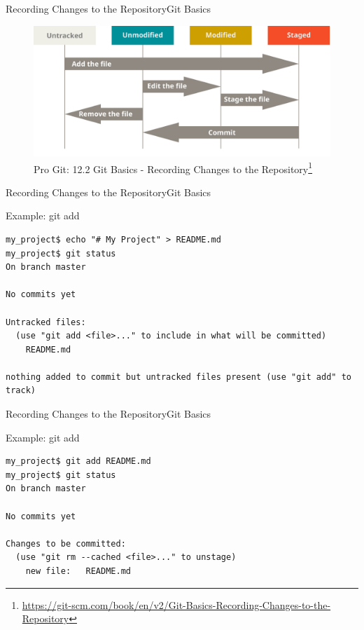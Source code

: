 \documentclass[aspectratio=169]{beamer}
\renewcommand{\footnotesize}{\tiny}
\begin{document}
\begin{frame}{Recording Changes to the Repository}{Git Basics}
\begin{figure}
    \centering
    \includegraphics[width=\textwidth,height=0.6\textheight,keepaspectratio]{lifecycle}
    \caption{
        Pro Git: 12.2 Git Basics - Recording Changes to the Repository\footnote{\url{https://git-scm.com/book/en/v2/Git-Basics-Recording-Changes-to-the-Repository}}
    }
\end{figure}
\end{frame}

\begin{frame}[fragile]{Recording Changes to the Repository}{Git Basics}
\begin{block}{Example: \ttfamily git add}
\begin{verbatim}
my_project$ echo "# My Project" > README.md
my_project$ git status 
On branch master

No commits yet

Untracked files:
  (use "git add <file>..." to include in what will be committed)
	README.md

nothing added to commit but untracked files present (use "git add" to track)
\end{verbatim}
\end{block}
\end{frame}

\begin{frame}[fragile]{Recording Changes to the Repository}{Git Basics}
\begin{block}{Example: \ttfamily git add}
\begin{verbatim}
my_project$ git add README.md
my_project$ git status 
On branch master

No commits yet

Changes to be committed:
  (use "git rm --cached <file>..." to unstage)
	new file:   README.md
\end{verbatim}
\end{block}
\end{frame}
\end{document}
